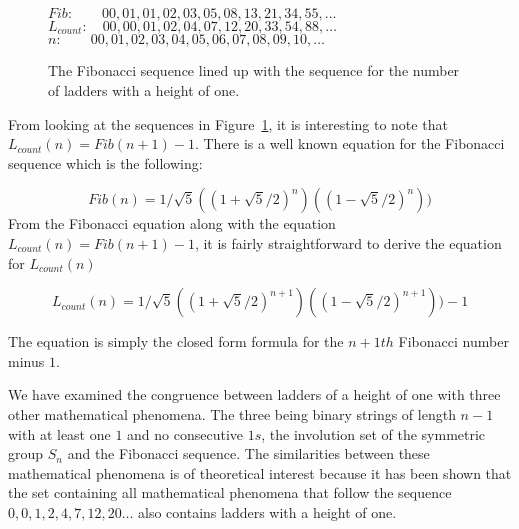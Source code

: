 \begin{figure}[!htp]
    \centering
    $Fib: \qquad 00,01,01,02,03,05,08,13,21,34,55, \dots$\newline
    $L_{count}: \quad   00,00,01,02,04,07,12,20,33,54,88, \dots$\newline
    $n: \qquad   00,01,02,03,04,05,06,07,08,09,10, \dots$\newline
    \caption{The Fibonacci sequence lined up with the sequence for the number of ladders with a height of one.}
    \label{Fig:FibLadderSequence}

\end{figure}

From looking at the sequences in Figure~\ref{Fig:FibLadderSequence}, it is interesting to note that\newline
$L_{count}(n)=Fib(n+1)-1$. 
There is a well known equation for the Fibonacci sequence which is the following: 

\begin{equation*}
   Fib(n)=1/\sqrt{5}((1+\sqrt{5}/2)^{n})((1-\sqrt{5}/2)^{n}))
\end{equation*}\cite{A12}
From the Fibonacci equation along with the equation $L_{count}(n)=Fib(n+1)-1$, it is fairly straightforward to derive the 
equation for $L_{count}(n)$
\begin{center}
\begin{equation*}
    L_{count}(n)=1/\sqrt{5} ((1+\sqrt{5}/2)^{n+1})((1-\sqrt{5}/2)^{n+1}))-1
\end{equation*}
\end{center}
The equation is simply the closed form formula for the $n+1th$ Fibonacci number minus $1$.\par 

We have examined the congruence between ladders of a height of one with three other mathematical phenomena. The three being 
binary strings of length $n-1$ with at least one $1$ and no consecutive $1s$, the involution set of the symmetric group $S_{n}$
and the Fibonacci sequence. The similarities between these mathematical phenomena is of theoretical interest because it has been 
shown that the set containing all mathematical phenomena that follow the sequence $0,0,1,2,4,7,12,20\dots$ also contains 
ladders with a height of one.




